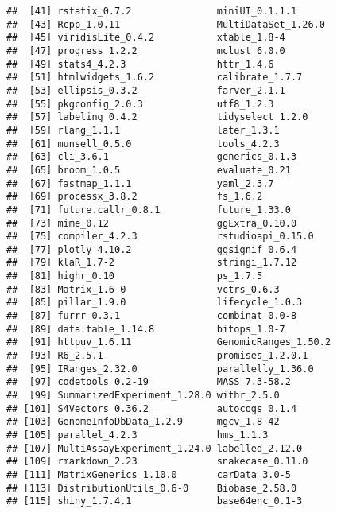 \documentclass[
]{article}
\begin{document}
\begin{verbatim}
##  [41] rstatix_0.7.2               miniUI_0.1.1.1             
##  [43] Rcpp_1.0.11                 MultiDataSet_1.26.0        
##  [45] viridisLite_0.4.2           xtable_1.8-4               
##  [47] progress_1.2.2              mclust_6.0.0               
##  [49] stats4_4.2.3                httr_1.4.6                 
##  [51] htmlwidgets_1.6.2           calibrate_1.7.7            
##  [53] ellipsis_0.3.2              farver_2.1.1               
##  [55] pkgconfig_2.0.3             utf8_1.2.3                 
##  [57] labeling_0.4.2              tidyselect_1.2.0           
##  [59] rlang_1.1.1                 later_1.3.1                
##  [61] munsell_0.5.0               tools_4.2.3                
##  [63] cli_3.6.1                   generics_0.1.3             
##  [65] broom_1.0.5                 evaluate_0.21              
##  [67] fastmap_1.1.1               yaml_2.3.7                 
##  [69] processx_3.8.2              fs_1.6.2                   
##  [71] future.callr_0.8.1          future_1.33.0              
##  [73] mime_0.12                   ggExtra_0.10.0             
##  [75] compiler_4.2.3              rstudioapi_0.15.0          
##  [77] plotly_4.10.2               ggsignif_0.6.4             
##  [79] klaR_1.7-2                  stringi_1.7.12             
##  [81] highr_0.10                  ps_1.7.5                   
##  [83] Matrix_1.6-0                vctrs_0.6.3                
##  [85] pillar_1.9.0                lifecycle_1.0.3            
##  [87] furrr_0.3.1                 combinat_0.0-8             
##  [89] data.table_1.14.8           bitops_1.0-7               
##  [91] httpuv_1.6.11               GenomicRanges_1.50.2       
##  [93] R6_2.5.1                    promises_1.2.0.1           
##  [95] IRanges_2.32.0              parallelly_1.36.0          
##  [97] codetools_0.2-19            MASS_7.3-58.2              
##  [99] SummarizedExperiment_1.28.0 withr_2.5.0                
## [101] S4Vectors_0.36.2            autocogs_0.1.4             
## [103] GenomeInfoDbData_1.2.9      mgcv_1.8-42                
## [105] parallel_4.2.3              hms_1.1.3                  
## [107] MultiAssayExperiment_1.24.0 labelled_2.12.0            
## [109] rmarkdown_2.23              snakecase_0.11.0           
## [111] MatrixGenerics_1.10.0       carData_3.0-5              
## [113] DistributionUtils_0.6-0     Biobase_2.58.0             
## [115] shiny_1.7.4.1               base64enc_0.1-3
\end{verbatim}
\end{document}
